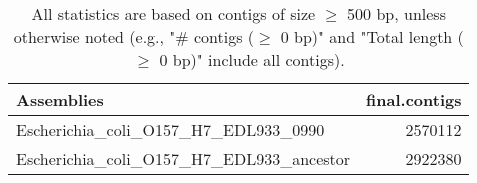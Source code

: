 \documentclass[12pt,a4paper]{article}
\begin{document}
\begin{table}[ht]
\begin{center}
\caption{All statistics are based on contigs of size $\geq$ 500 bp, unless otherwise noted (e.g., "\# contigs ($\geq$ 0 bp)" and "Total length ($\geq$ 0 bp)" include all contigs).}
\begin{tabular}{|l*{1}{|r}|}
\hline
Assemblies & final.contigs \\ \hline
Escherichia\_coli\_O157\_H7\_EDL933\_0990 & 2570112 \\ \hline
Escherichia\_coli\_O157\_H7\_EDL933\_ancestor & 2922380 \\ \hline
\end{tabular}
\end{center}
\end{table}
\end{document}
